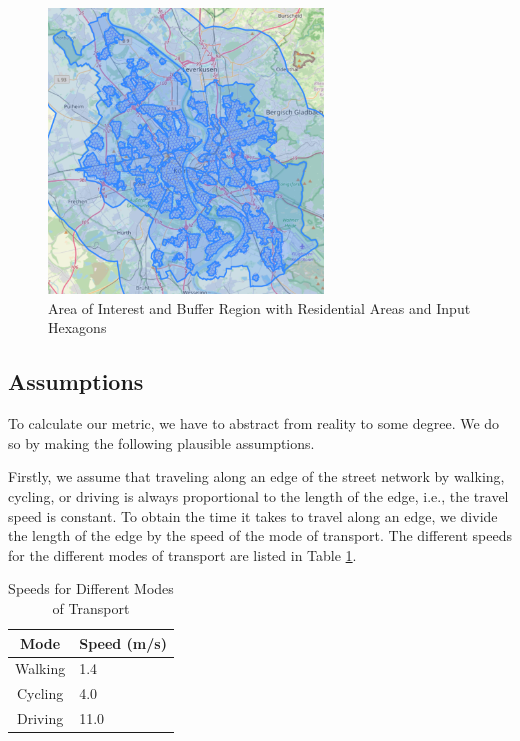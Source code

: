 \begin{figure}
  \begin{center}
    \includegraphics[width=0.65\textwidth]{Figures/experiment/input_hexagons_residential_areas.png}
  \end{center}
  \caption{Area of Interest and Buffer Region with Residential Areas and Input Hexagons}
  \label{fig:input_hexagons_residential_areas}
\end{figure}


\subsection{Assumptions}
\label{subs:assumptions}

To calculate our metric, we have to abstract from reality to some degree.
We do so by making the following plausible assumptions.
 
Firstly, we assume that traveling along an edge of the street network by walking, cycling, or driving is always proportional to the length of the edge, i.e., the travel speed is constant.
To obtain the time it takes to travel along an edge, we divide the length of the edge by the speed of the mode of transport.
The different speeds for the different modes of transport are listed in Table \ref{table:speeds}.

\begin{table}[h]
\centering
\begin{tabular}{|c|l|}
\hline
\textbf{Mode} & \textbf{Speed (m/s)} \\
\hline
Walking & 1.4 \\
\hline
Cycling & 4.0 \\
\hline
Driving & 11.0 \\
\hline
\end{tabular}
\caption{Speeds for Different Modes of Transport}
\label{table:speeds}
\end{table}

